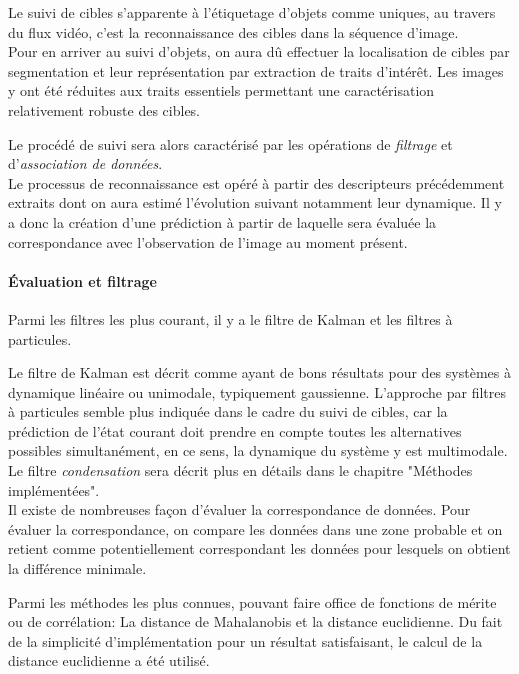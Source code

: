 \documentclass[a4paper,12pt]{report}
\begin{document}
Le suivi de cibles s'apparente à l'étiquetage d'objets comme uniques, au travers du flux vidéo, c'est la reconnaissance des cibles dans la séquence d'image. \\

Pour en arriver au suivi d'objets, on aura dû effectuer la localisation de cibles par segmentation et leur représentation par extraction de traits d'intérêt.
Les images y ont été réduites aux traits essentiels permettant une caractérisation relativement robuste des cibles. 

Le procédé de suivi sera alors caractérisé par les opérations de \emph{filtrage} et d'\emph{association de données}.  \\

Le processus de reconnaissance est opéré à partir des descripteurs précédemment extraits dont on aura estimé l'évolution suivant notamment leur dynamique. Il y a donc la création d'une prédiction à partir de laquelle sera évaluée la correspondance avec l'observation de l'image au moment présent. 

\paragraph{Évaluation et filtrage}
Parmi les filtres les plus courant, il y a le filtre de Kalman et les filtres à particules.

Le filtre de Kalman est décrit comme ayant de bons résultats pour des systèmes à dynamique linéaire ou unimodale, typiquement gaussienne. L'approche par filtres à particules semble plus indiquée dans le cadre du suivi de cibles, car la prédiction de l'état courant doit prendre en compte toutes les alternatives possibles simultanément, en ce sens, la dynamique du système y est multimodale.
Le filtre \textit{condensation} sera décrit plus en détails dans le chapitre "Méthodes implémentées". \\  

Il existe de nombreuses façon d'évaluer la correspondance de données. 
Pour évaluer la correspondance, on compare les données dans une zone probable et on retient comme potentiellement correspondant les données pour lesquels on obtient la différence minimale.
 
Parmi les méthodes les plus connues, pouvant faire office de fonctions de mérite ou de corrélation: 
La distance de Mahalanobis et la distance euclidienne. 
Du fait de la simplicité d'implémentation pour un résultat satisfaisant, le calcul de la distance euclidienne a été utilisé.
\end{document}
